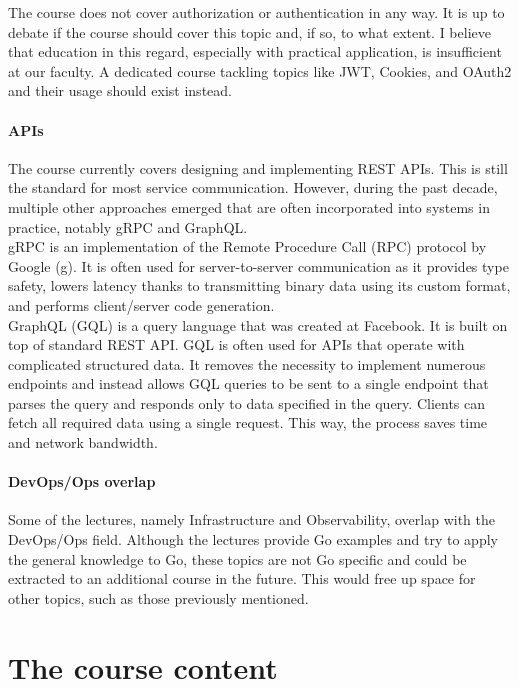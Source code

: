 \documentclass[
  digital,
  color,
  oneside,
  nosansbold,
  nocolorbold,
  lof,
  lot,
]{fithesis4}
\begin{document}
The course does not cover authorization or authentication in any way. It is up to debate if the course should cover this topic and, if so, to what extent. I believe that education in this regard, especially with practical application, is insufficient at our faculty. A dedicated course tackling topics like JWT, Cookies, and OAuth2 and their usage should exist instead.

\subsubsection{APIs}

The course currently covers designing and implementing REST APIs. This is still the standard for most service communication. However, during the past decade, multiple other approaches emerged that are often incorporated into systems in practice, notably gRPC and GraphQL. \\

gRPC is an implementation of the Remote Procedure Call (RPC) protocol by Google (g). It is often used for server-to-server communication as it provides type safety, lowers latency thanks to transmitting binary data using its custom format, and performs client/server code generation. \\

GraphQL (GQL) is a query language that was created at Facebook. It is built on top of standard REST API. GQL is often used for APIs that operate with complicated structured data. It removes the necessity to implement numerous endpoints and instead allows GQL queries to be sent to a single endpoint that parses the query and responds only to data specified in the query. Clients can fetch all required data using a single request. This way, the process saves time and network bandwidth.

\subsubsection{DevOps/Ops overlap}

Some of the lectures, namely Infrastructure and Observability, overlap with the DevOps/Ops field. Although the lectures provide Go examples and try to apply the general knowledge to Go, these topics are not Go specific and could be extracted to an additional course in the future. This would free up space for other topics, such as those previously mentioned.

\chapter{The course content}\label{chapter-content}
\end{document}
